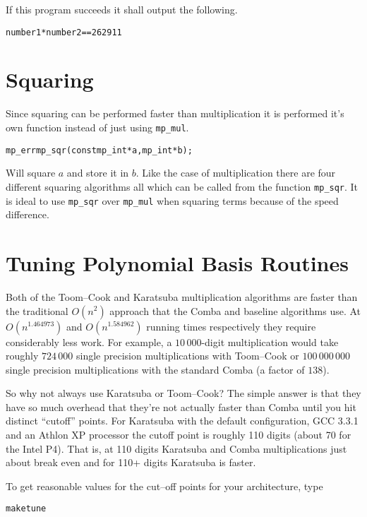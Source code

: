 \documentclass[synpaper]{book}
\begin{document}
If this program succeeds it shall output the following.

\begin{alltt}
number1 * number2 == 262911
\end{alltt}

\section{Squaring}
Since squaring can be performed faster than multiplication it is performed it's own function
instead of just using
\texttt{mp\_mul}.

\begin{alltt}
mp_err mp_sqr (const mp_int *a, mp_int *b);
\end{alltt}

Will square $a$ and store it in $b$.  Like the case of multiplication there are four different
squaring algorithms all which can be called from the function \texttt{mp\_sqr}. It is ideal to use
\texttt{mp\_sqr} over \texttt{mp\_mul} when squaring terms because of the speed difference.

\section{Tuning Polynomial Basis Routines}

Both of the Toom--Cook and Karatsuba multiplication algorithms are faster than the traditional
$O(n^2)$ approach that the Comba and baseline algorithms use.	  At $O(n^{1.464973})$ and
$O(n^{1.584962})$ running times respectively they require considerably less work.  For example, a
$10\,000$-digit multiplication would take roughly $724\,000$ single precision multiplications with
Toom--Cook or $100\,000\,000$ single precision multiplications with the standard Comba (a factor of
$138$).

So why not always use Karatsuba or Toom--Cook?	The simple answer is that they have so much
overhead that they're not actually faster than Comba until you hit distinct  ``cutoff'' points.
For Karatsuba with the default configuration, GCC 3.3.1 and an Athlon XP processor the cutoff point
is roughly 110 digits (about 70 for the Intel P4).  That is, at 110 digits Karatsuba and Comba
multiplications just about break even and for 110+ digits Karatsuba is faster.

To get reasonable values for the cut--off points for your architecture, type

\begin{alltt}
make tune
\end{alltt}
\end{document}
